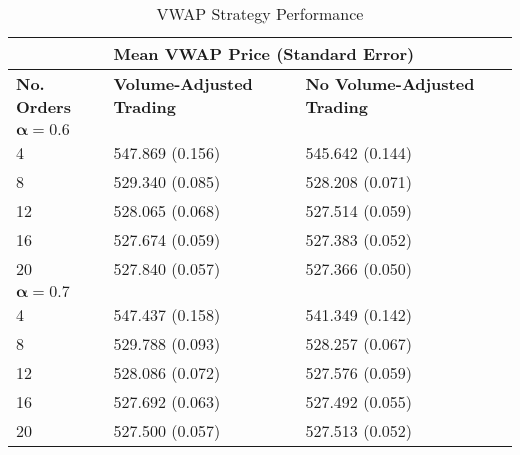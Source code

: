 \begin{table}[htbp]
\begin{center}
\caption{VWAP Strategy Performance} \label{tab:vwap_averages}
\begin{tabular}{lll}
\hline \hline
\multicolumn{1}{l|}{}                  & \multicolumn{2}{l}{\textbf{Mean VWAP Price (Standard Error)}}                               \\ \hline
\multicolumn{1}{l|}{\textbf{No. Orders}} & \multicolumn{1}{l|}{\textbf{Volume-Adjusted Trading}} & \textbf{No Volume-Adjusted Trading} \\ \hline
\multicolumn{3}{l}{$\boldsymbol{\alpha = 0.6}$}                                                                                         \\ \hline
\multicolumn{1}{l|}{4}                 & \multicolumn{1}{l|}{547.869 (0.156)}              & 545.642 (0.144)            \\
\multicolumn{1}{l|}{8}                 & \multicolumn{1}{l|}{529.340 (0.085)}              & 528.208 (0.071)            \\
\multicolumn{1}{l|}{12}                & \multicolumn{1}{l|}{528.065 (0.068)}              & 527.514 (0.059)            \\
\multicolumn{1}{l|}{16}                & \multicolumn{1}{l|}{527.674 (0.059)}              & 527.383 (0.052)            \\
\multicolumn{1}{l|}{20}                & \multicolumn{1}{l|}{527.840 (0.057)}              & 527.366 (0.050)            \\ \hline
\multicolumn{3}{l}{$\boldsymbol{\alpha = 0.7}$}                                                                                         \\ \hline
\multicolumn{1}{l|}{4}                 & \multicolumn{1}{l|}{547.437 (0.158)}              & 541.349 (0.142)            \\
\multicolumn{1}{l|}{8}                 & \multicolumn{1}{l|}{529.788 (0.093)}              & 528.257 (0.067)            \\
\multicolumn{1}{l|}{12}                & \multicolumn{1}{l|}{528.086 (0.072)}              & 527.576 (0.059)            \\
\multicolumn{1}{l|}{16}                & \multicolumn{1}{l|}{527.692 (0.063)}              & 527.492 (0.055)            \\
\multicolumn{1}{l|}{20}                & \multicolumn{1}{l|}{527.500 (0.057)}              & 527.513 (0.052)            \\ \hline

\end{tabular}
\end{center}
\end{table}
